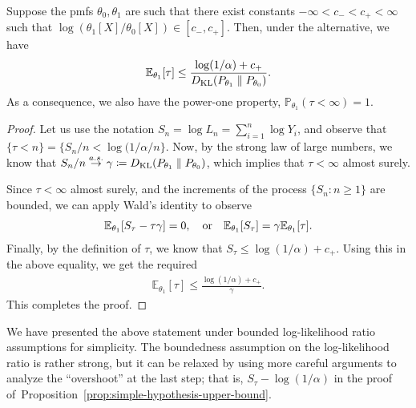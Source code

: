 \documentclass[12pt]{article}
\begin{document}
\begin{proposition}
    \label{prop:simple-hypothesis-upper-bound} Suppose the pmfs $\theta_0, \theta_1$ are such that there exist constants $-\infty < c_- <  c_+ < \infty$ such that $\log(\theta_1[X]/\theta_0[X]) \in [c_-, c_+]$.  Then, under the alternative, we have 
    \begin{align}
        \mathbb{E}_{\theta_1}[\tau] \leq \frac{\log(1/\alpha) + c_+}{D_{\text{KL}}(P_{\theta_1} \parallel P_{\theta_0})}. 
    \end{align}
    As a consequence, we also have the power-one property, $\mathbb{P}_{\theta_1}(\tau < \infty) = 1$. 
\end{proposition}
\begin{proof}
    Let us use the notation $S_n = \log L_n = \sum_{i=1}^n \log Y_i$, and observe that $\{\tau < n\} = \{S_n/n < \log(1/\alpha/n\}$. Now, by the strong law of large numbers, we know that $S_n/ n \stackrel{a.s.}{\to} \gamma \coloneqq D_{\text{KL}}(P_{\theta_1} \parallel P_{\theta_0})$, which implies that $\tau < \infty$ almost surely. 

    Since $\tau< \infty$ almost surely, and the increments of the process $\{S_n: n \geq 1\}$ are bounded, we can apply Wald's identity to observe 
    \begin{align}
        \mathbb{E}_{\theta_1}[S_\tau - \tau \gamma] = 0, \quad \text{or} \quad 
        \mathbb{E}_{\theta_1}[S_\tau] = \gamma \mathbb{E}_{\theta_1}[\tau]. 
    \end{align}
    Finally, by the definition of $\tau$, we know that $S_{\tau} \leq \log(1/\alpha) + c_+$. Using this in the above equality, we get the required 
    \begin{align}
        \mathbb{E}_{\theta_1}[\tau] \leq \frac{\log(1/\alpha) + c_+}{\gamma}. 
    \end{align}
    This completes the proof. 
\end{proof}
\begin{remark}
    We have presented the above statement under bounded log-likelihood ratio assumptions for simplicity. The boundedness assumption on the log-likelihood ratio is rather strong, but it can be relaxed by using more careful arguments to analyze the ``overshoot'' at the last step; that is, $S_{\tau} - \log(1/\alpha)$ in the proof of~Proposition~\ref{prop:simple-hypothesis-upper-bound}.  
\end{remark}
\end{document}
